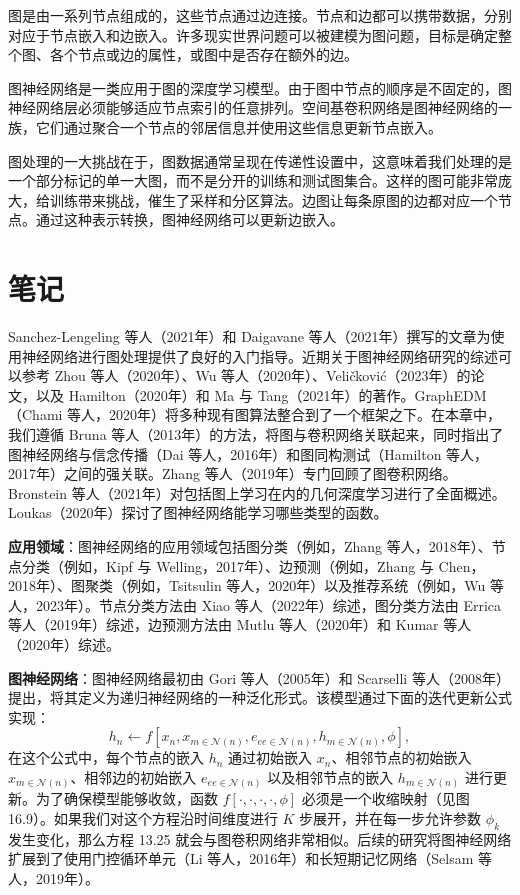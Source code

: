 \documentclass[lang=cn,newtx,10pt,scheme=chinese]{elegantbook}
\begin{document}
图是由一系列节点组成的，这些节点通过边连接。节点和边都可以携带数据，分别对应于节点嵌入和边嵌入。许多现实世界问题可以被建模为图问题，目标是确定整个图、各个节点或边的属性，或图中是否存在额外的边。

图神经网络是一类应用于图的深度学习模型。由于图中节点的顺序是不固定的，图神经网络层必须能够适应节点索引的任意排列。空间基卷积网络是图神经网络的一族，它们通过聚合一个节点的邻居信息并使用这些信息更新节点嵌入。

图处理的一大挑战在于，图数据通常呈现在传递性设置中，这意味着我们处理的是一个部分标记的单一大图，而不是分开的训练和测试图集合。这样的图可能非常庞大，给训练带来挑战，催生了采样和分区算法。边图让每条原图的边都对应一个节点。通过这种表示转换，图神经网络可以更新边嵌入。

\section{笔记}
Sanchez-Lengeling 等人（2021年）和 Daigavane 等人（2021年）撰写的文章为使用神经网络进行图处理提供了良好的入门指导。近期关于图神经网络研究的综述可以参考 Zhou 等人（2020年）、Wu 等人（2020年）、Veličković（2023年）的论文，以及 Hamilton（2020年）和 Ma 与 Tang（2021年）的著作。GraphEDM（Chami 等人，2020年）将多种现有图算法整合到了一个框架之下。在本章中，我们遵循 Bruna 等人（2013年）的方法，将图与卷积网络关联起来，同时指出了图神经网络与信念传播（Dai 等人，2016年）和图同构测试（Hamilton 等人，2017年）之间的强关联。Zhang 等人（2019年）专门回顾了图卷积网络。Bronstein 等人（2021年）对包括图上学习在内的几何深度学习进行了全面概述。Loukas（2020年）探讨了图神经网络能学习哪些类型的函数。

\textbf{应用领域}：图神经网络的应用领域包括图分类（例如，Zhang 等人，2018年）、节点分类（例如，Kipf 与 Welling，2017年）、边预测（例如，Zhang 与 Chen，2018年）、图聚类（例如，Tsitsulin 等人，2020年）以及推荐系统（例如，Wu 等人，2023年）。节点分类方法由 Xiao 等人（2022年）综述，图分类方法由 Errica 等人（2019年）综述，边预测方法由 Mutlu 等人（2020年）和 Kumar 等人（2020年）综述。

\textbf{图神经网络}：图神经网络最初由 Gori 等人（2005年）和 Scarselli 等人（2008年）提出，将其定义为递归神经网络的一种泛化形式。该模型通过下面的迭代更新公式实现：
\begin{equation}
h_n \leftarrow f \left[ x_n, x_{m\in \mathcal{N}(n)}, e_{ee\in \mathcal{N}(n)}, h_{m\in \mathcal{N}(n)}, \phi \right], 
\end{equation}
在这个公式中，每个节点的嵌入 \(h_n\) 通过初始嵌入 \(x_n\)、相邻节点的初始嵌入 \(x_{m\in \mathcal{N}(n)}\)、相邻边的初始嵌入 \(e_{ee\in \mathcal{N}(n)}\) 以及相邻节点的嵌入 \(h_{m\in \mathcal{N}(n)}\) 进行更新。为了确保模型能够收敛，函数 \(f[\cdot, \cdot, \cdot, \cdot, \phi]\) 必须是一个收缩映射（见图 16.9）。如果我们对这个方程沿时间维度进行 \(K\) 步展开，并在每一步允许参数 \(\phi_k\) 发生变化，那么方程 13.25 就会与图卷积网络非常相似。后续的研究将图神经网络扩展到了使用门控循环单元（Li 等人，2016年）和长短期记忆网络（Selsam 等人，2019年）。
\end{document}
